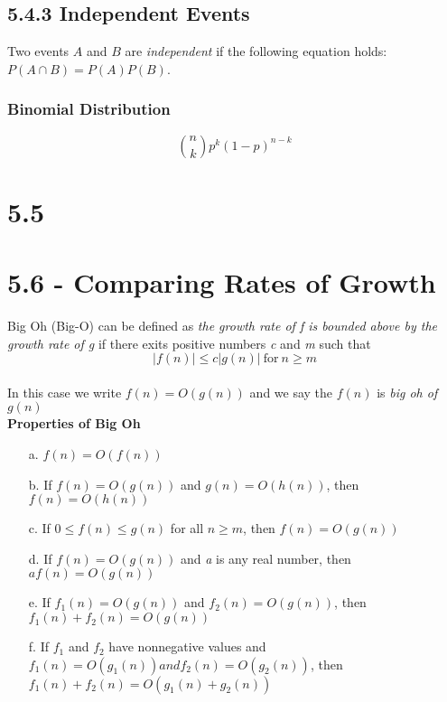 \documentclass[10pt,twocolumn]{article}
\begin{document}
	\subsection*{5.4.3 Independent Events}
	
	Two events $A$ and $B$ are \emph{independent} if the following equation holds: $P(A \cap B)=P(A)P(B)$.
	
	\subsubsection*{Binomial Distribution}
	
	\[\binom{n}{k}p^k(1-p)^{n-k}\]
	
	\section*{5.5}
	
	\section*{5.6 - Comparing Rates of Growth}
        Big Oh (Big-O) can be defined as \textit{the growth rate of f
          is bounded above by the growth rate of g} if there exits
        positive numbers \textit{c} and \textit{m} such that \\
        \[ |f(n)| \leq c|g(n)| \: \textrm{for}\: n\geq m\]\\
        In this case we write $f(n) = O(g(n))$ and we say the $f(n)$
        is \textit{big oh of $g(n)$}\\
        \textbf{Properties of Big Oh}\\
        \begin{itemize}
        \item[a.] $f(n)=O(f(n))$
        \item[b.] If $f(n)=O(g(n))$ and $ g(n)=O(h(n))$, then $f(n)=O(h(n))$
        \item[c.] If $0\leq f(n) \leq g(n)$ for all $n \geq m$, then $f(n)=O(g(n))$
        \item[d.] If $f(n)=O(g(n))$ and \textit{a} is any real number, then $af(n)=O(g(n))$
        \item[e.] If $f_1(n)=O(g(n))$ and $f_2(n)=O(g(n))$, then $f_1(n) + f_2(n) = O(g(n))$
        \item[f.] If $f_1$ and $f_2$ have nonnegative values and
          $f_1(n) = O(g_1(n)) and f_2(n) = O(g_2(n))$, then $f_1(n) +
          f_2(n) = O(g_1(n) + g_2(n))$
	\end{itemize}
\end{document}
